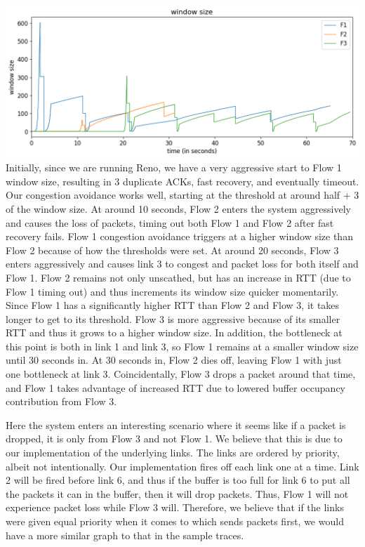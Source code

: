 \documentclass{article}
\begin{document}
\includegraphics[width = \textwidth]{"test_case2_reno window size"}
Initially, since we are running Reno, we have a very aggressive start to Flow 1 window size, resulting in 3 duplicate ACKs, fast recovery, and eventually timeout. Our congestion avoidance works well, starting at the threshold at around half + 3 of the window size. At around 10 seconds, Flow 2 enters the system aggressively and causes the loss of packets, timing out both Flow 1 and Flow 2 after fast recovery fails. Flow 1 congestion avoidance triggers at a higher window size than Flow 2 because of how the thresholds were set. At around 20 seconds, Flow 3 enters aggressively and causes link 3 to congest and packet loss for both itself and Flow 1. Flow 2 remains not only unscathed, but has an increase in RTT (due to Flow 1 timing out) and thus increments its window size quicker momentarily. Since Flow 1 has a significantly higher RTT than Flow 2 and Flow 3, it takes longer to get to its threshold. Flow 3 is more aggressive because of its smaller RTT and thus it grows to a higher window size. In addition, the bottleneck at this point is both in link 1 and link 3, so Flow 1 remains at a smaller window size until 30 seconds in. At 30 seconds in, Flow 2 dies off, leaving Flow 1 with just one bottleneck at link 3. Coincidentally, Flow 3 drops a packet around that time, and Flow 1 takes advantage of increased RTT due to lowered buffer occupancy contribution from Flow 3. 

Here the system enters an interesting scenario where it seems like if a packet is dropped, it is only from Flow 3 and not Flow 1. We believe that this is due to our implementation of the underlying links. The links are ordered by priority, albeit not intentionally. Our implementation fires off each link one at a time. Link 2 will be fired before link 6, and thus if the buffer is too full for link 6 to put all the packets it can in the buffer, then it will drop packets. Thus, Flow 1 will not experience packet loss while Flow 3 will. Therefore, we believe that if the links were given equal priority when it comes to which sends packets first, we would have a more similar graph to that in the sample traces.
\end{document}
